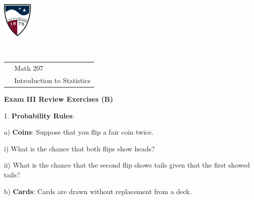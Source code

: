 \documentclass[10pt]{article}
\begin{document}
\pagestyle{empty}
\lstset{language=R, showspaces=false, showstringspaces=false}

\href{http://www.su.edu}{\includegraphics[height=1.75cm]{sulogo.eps}}
\vspace{-1.79cm}

{{\ }\hfill\small
\begin{tabular}{cl}
& Math 207\\
& Introduction to Statistics\\
\end{tabular}
}
\setlength{\baselineskip}{1.05\baselineskip}

\medskip

\begin{center}
\textbf{\large  Exam III Review Exercises (B)}
\end{center}\vspace{-15pt}

\newcommand{\HH}{\hspace{20pt}\hphantom{a) } }
%
\newcommand{\twobox}[2]{\begin{pspicture}(-0.3,0.2)(2,1.3)
\psframe(0,0)(0.7,0.7)\rput(0.35,0.35){#1}
\psframe(1,0)(1.7,0.7)\rput(1.35,0.35){#2}
\psline(-0.3,0.9)(-0.3,-0.2)(2,-0.2)(2,0.9)(-0.3,0.9)
\end{pspicture}}
%
\newcommand{\threebox}[3]{\begin{pspicture}(0.2,0.2)(2.5,1.3)
\psframe(0,0)(0.7,0.7)\rput(0.35,0.35){#1}
\psframe(1,0)(1.7,0.7)\rput(1.35,0.35){#2}
\psframe(2,0)(2.7,0.7)\rput(2.35,0.35){#3}
\psline(-0.3,0.9)(-0.3,-0.2)(3,-0.2)(3,0.9)(-0.3,0.9)
\end{pspicture}}

1. \textbf{Probability Rules}:

\hspace{10pt} a) \textbf{Coins}: Suppose that you flip a fair coin twice.

\hspace{20pt} i) What is the chance that both flips show heads?
\vspace{.5in}

\hspace{20pt} ii) What is the chance that the second flip shows tails given that the first showed tails?
\vspace{.5in}

\hspace{10pt} b) \textbf{Cards}:  Cards are drawn without replacement from a deck.
\end{document}
